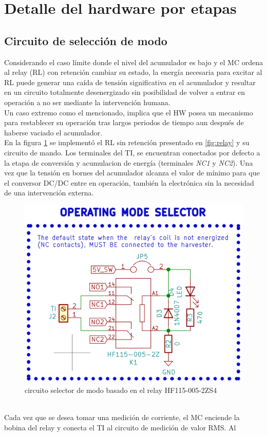 \section{Detalle del hardware por etapas}
\subsection{Circuito de selección de modo}
Considerando el caso límite donde el nivel del acumulador es bajo y el MC ordena al relay (RL) con retención cambiar su estado, la energía necesaria para excitar al RL puede generar una caída de tensión significativa en el acumulador y resultar en un circuito totalmente desenergizado sin posibilidad de volver a entrar en operación a no ser mediante la intervención humana.\\
Un caso extremo como el mencionado, implica que el HW posea un mecanismo para restablecer su operación tras largos periodos de tiempo aun después de haberse vaciado el acumulador.\\
En la figura \ref{fig:ctoselecciondemodo} se implementó el RL sin retención presentado en \ref{fig:relay} y su circuito de mando. Los terminales del TI, se encuentran conectados por defecto a la etapa de conversión y acumulacion de energía (terminales \textit{NC1} y \textit{NC2}). Una vez que la tensión en bornes del acumulador alcanza el valor de mínimo para que el conversor DC/DC entre en operación, también la electrónica sin la necesidad de una intervención externa.\\
\begin{figure}[h]
	\centering
	\includegraphics[width=0.7\linewidth]{Figures/cto_seleccion_de_modo}
	\caption{circuito selector de modo basado en el relay HF115-005-2ZS4}
	\label{fig:ctoselecciondemodo}
\end{figure}\\
Cada vez que se desea tomar una medición de corriente, el MC enciende la bobina del relay y conecta el TI al circuito de medición de valor RMS. Al \\

